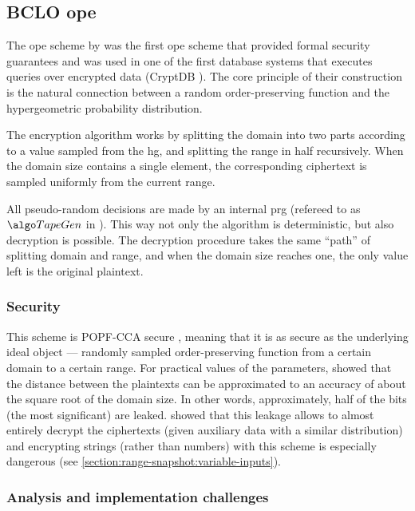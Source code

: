 \subsection{BCLO \texorpdfstring{\acrshort{ope}}{OPE} \texorpdfstring{\cite{bclo-ope}}{}}

	The \acrshort{ope} scheme by \textcite{bclo-ope} was the first \acrshort{ope} scheme that provided formal security guarantees and was used in one of the first database systems that executes queries over encrypted data (CryptDB \cite{crypt-db}).
 	The core principle of their construction is the natural connection between a random order-preserving function and the hypergeometric probability distribution.

	The encryption algorithm works by splitting the domain into two parts according to a value sampled from the \acrfull{hg}, and splitting the range in half recursively.
	When the domain size contains a single element, the corresponding ciphertext is sampled uniformly from the current range.

	All pseudo-random decisions are made by an internal \acrshort{prg} (refereed to as $\tapegen$ in \cite{bclo-ope}).
	This way not only the algorithm is deterministic, but also decryption is possible.
	The decryption procedure takes the same ``path'' of splitting domain and range, and when the domain size reaches one, the only value left is the original plaintext.

	\subsubsection{Security}
		This scheme is POPF-CCA secure \cite{bclo-ope}, meaning that it is as secure as the underlying ideal object --- randomly sampled order-preserving function from a certain domain to a certain range.
		For practical values of the parameters, \textcite{ope-leakage} showed that the distance between the plaintexts can be approximated to an accuracy of about the square root of the domain size.
		In other words, approximately, half of the bits (the most significant) are leaked.
		\textcite{leakage-abuse-grubs-2017} showed that this leakage allows to almost entirely decrypt the ciphertexts (given auxiliary data with a similar distribution) and encrypting strings (rather than numbers) with this scheme is especially dangerous (see \cref{section:range-snapshot:variable-inputs}).

	\subsubsection{Analysis and implementation challenges}

